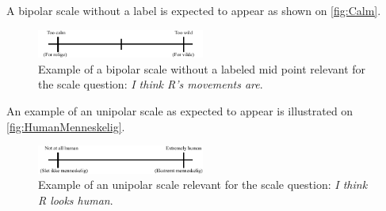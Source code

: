 \noindent
% 
A bipolar scale without a label is expected to appear as shown on \autoref{fig:Calm}.  
%
\begin{figure}[H]
\centering
\includegraphics[width = 0.49\textwidth]{Figure/CalmWild} 
\caption{Example of a bipolar scale without a labeled mid point relevant for the scale question: \textit{I think R's movements are}.}
\label{fig:Calm}
\end{figure}
\noindent
%
An example of an unipolar scale as expected to appear is illustrated on \autoref{fig:HumanMenneskelig}.
%
\begin{figure}[H]
\centering
\includegraphics[width = 0.49\textwidth]{Figure/HumanMenneskelig} 
\caption{Example of an unipolar scale relevant for the scale question: \textit{I think R looks human}.}
\label{fig:HumanMenneskelig}
\end{figure}
\noindent
%

